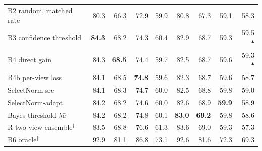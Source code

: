 \begin{tabular}{@{}lrrrrrrrr@{}}
B2 random, matched rate & 80.3 & 66.3 & 72.9 & 59.9 & 80.8 & 67.3 & 59.1 & 58.3\\
B3 confidence threshold & \textbf{84.3} & 68.2 & 74.3 & 60.4 & 82.9 & 68.7 & 59.3 & 59.5$^{\blacktriangle}$\\
B4 direct gain & 84.3 & \textbf{68.5} & 74.4 & 59.7 & 82.5 & 68.7 & 59.6 & 59.3$^{\blacktriangle}$\\
B4b per-view loss & 84.1 & 68.5 & \textbf{74.8} & 59.6 & 82.3 & 68.7 & 59.6 & 58.7\\
SelectNorm-src & 84.1 & 68.3 & 74.7 & 60.0 & 82.5 & 68.8 & 59.8 & 59.0\\
\rowcolor{black!6}SelectNorm-adapt & 84.2 & 68.2 & 74.6 & 60.0 & 82.6 & 68.9 & \textbf{59.9} & 58.9\\
\quad Bayes threshold $\lambda\bar c$ & 84.2 & 68.2 & 74.8 & 60.1 & \textbf{83.0} & \textbf{69.2} & 59.8 & 58.6\\
\addlinespace[2pt]
R two-view ensemble$^\dagger$ & 83.5 & 68.8 & 76.6 & 61.3 & 83.6 & 69.0 & 59.3 & 57.3\\
B6 oracle$^\ddagger$ & 92.9 & 81.1 & 86.8 & 73.1 & 92.6 & 81.6 & 72.3 & 69.3\\
\bottomrule\end{tabular}
